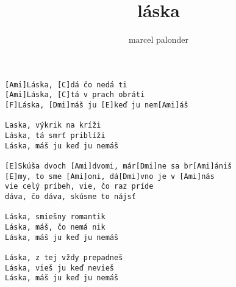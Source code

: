 \author{marcel palonder}
\title{láska}
\maketitle
\begin{verbatim}
[Ami]Láska, [C]dá čo nedá ti 
[Ami]Láska, [C]tá v prach obráti 
[F]Láska, [Dmi]máš ju [E]keď ju nem[Ami]áš 

Laska, výkrik na kríži 
Láska, tá smrť priblíži 
Láska, máš ju keď ju nemáš 

[E]Skúša dvoch [Ami]dvomi, már[Dmi]ne sa br[Ami]ániš 
[E]my, to sme [Ami]oni, dá[Dmi]vno je v [Ami]nás 
vie celý príbeh, vie, čo raz príde 
dáva, čo dáva, skúsme to nájsť 

Láska, smiešny romantik 
Láska, máš, čo nemá nik 
Láska, máš ju keď ju nemáš 

Láska, z tej vždy prepadneš 
Láska, vieš ju keď nevieš 
Láska, máš ju keď ju nemáš
\end{verbatim}
